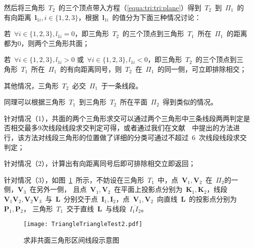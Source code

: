 然后将三角形~$T_2$~的三个顶点带入方程（\ref{equa:tri:tri:plane}）得到~$T_2$~到~$\Pi_1$~的有向距离~$\bm{l}_{1i}, i \in \{1,2,3\}$，根据~$\bm{l}_{1i}$~的值分为下面三种情况讨论：\\ \indent
\begin{inparaenum}[(1)]
  \item 若~$\forall i \in \{1,2,3\}, l_{1i} = 0$，即三角形~$T_2$~的三个顶点到三角形~$T_1$~所在~$\Pi_1$~的距离都为$0$，则两个三角形共面；\\ \indent
  \item 若~$\forall i \in \{1,2,3\}, l_{1i} > 0$ 或~$\forall i \in \{1,2,3\}, l_{1i} < 0$，即三角形~$T_2$~的三个顶点到三角形~$T_1$~所在~$\Pi_1$~的有向距离同号，则~$T_2$~在~$\Pi_1$~的同一侧，可立即排除相交；\\ \indent
  \item 其他情况，三角形~$T_2$~必交~$\Pi_1$~于一条线段。
\end{inparaenum}

同理可以根据三角形~$T_1$~到三角形~$T_2$~所在平面~$\Pi_2$~得到类似的情况。

针对情况（1），共面的两个三角形求交可以通过两个三角形中三条线段两两判定是否相交最多9次线段线段求交判定可得，或者通过我们在文献~~中提出的方法进行，该方法对线段三角形的位置做了详细的分类可通过不超过~6~次线段线段求交判定；

针对情况（2），计算出有向距离同号后即可排除相交立即返回；

针对情况（3），如图~\ref{fig:two:triangle:ui2}~所示，不妨设在三角形~$T_1$~中，点~$\bm{V}_1, \bm{V}_2$~在~$\Pi_2$的一侧，$\bm{V}_3$~在另外一侧，
且点~$\bm{V}_1, \bm{V}_2$~在平面上投影点分别为~$\bm{K}_1,\bm{K}_2$，线段~$\bm{V}_1\bm{V}_2, \bm{V}_2\bm{V}_3$~与~$\bm{L}$~分别交于点~$\bm{I}_1,\bm{I}_2$，点~$\bm{V}_1,\bm{V}_2$~向直线~$\bm{L}$~的投影点分别为~$\bm{P}_1,\bm{P}_2$，
三角形~$T_1$~交于直线~$\bm{L}$~与线段~$\overline{I_1I_2}$。%

\begin{figure}[htbp]
  \centering
    \texttt{[image: TriangleTriangleTest2.pdf]}
    \caption{求非共面三角形区间线段示意图\cite{Moller1997}}
  \label{fig:two:triangle:ui2}
\end{figure}

